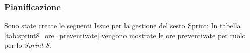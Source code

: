 \subsubsection{Pianificazione}
\label{sec:sprint8_pianificazione}
Sono state create le seguenti Issue per la gestione del sesto Sprint: 
\hyperref[tab:sprint8_ore_preventivate]{In tabella \ref{tab:sprint8_ore_preventivate}} vengono mostrate le ore preventivate per ruolo per lo \textit{Sprint 8}.

\begin{table}[H]
    \centering
    \caption{Ore preventivate per ruolo Sprint 8}
    \label{tab:sprint8_ore_preventivate}
\end{table}